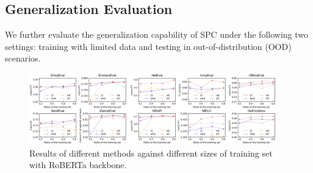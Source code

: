 \documentclass[letterpaper]{article} %
\begin{document}
\subsection{Generalization Evaluation}
We further evaluate the generalization capability of SPC under the following two settings: training with limited data and testing in out-of-distribution (OOD) scenarios.


\begin{figure}[t]
\centering
\includegraphics[width=0.95\textwidth]{figures/data_per.png}
\caption{Results of different methods against different sizes of training set with RoBERTa backbone.}
\label{fig:training}
\end{figure}



\begin{table}[t]
\centering
{}
\caption{Out-of-distribution evaluation results (\%).
For instance, ``EmotionEval $\rightarrow$ GoEmotions" refers to training the model on the training set of EmotionEval and making predictions using the test set of GoEmotions.
We experiment with RoBERTa backbone.
We run five random seeds and report the average results on test sets of target domains. Labels that do not appear in the training corpus are not evaluated.
}
\label{tab:ood-performance}
\end{table}
\end{document}
